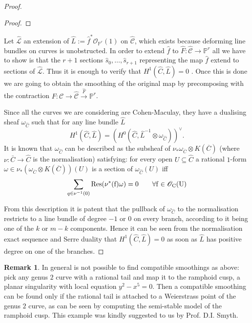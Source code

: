\documentclass[11pt]{amsart}
\newcommand{\PP}{\mathbb P}
\newcommand{\OO}{\mathcal O}
\renewcommand{\to}{\rightarrow}
\newcommand{\cC}{\mathcal C}
\theoremstyle{plain}
\theoremstyle{definition}
\newtheorem{remark}[thm]{Remark}
\begin{document}
\begin{proof}
\begin{proof}
\end{proof}

Let $\hat{\mathcal L}$ an extension of $\hat{L}:=\hat{f}^*\OO_{\PP^r}(1)$ on $\hat{\cC}$, which exists because deforming line bundles on curves is unobstructed.
In order to extend $\hat{f}$ to $\hat{F}\colon \hat{\cC}\to\PP^r$ all we have to show is that the $r+1$ sections $\hat{s}_0,\dots, \hat{s}_{r+1}$ representing the map $\hat{f}$ extend to sections of $\hat{\mathcal{L}}.$
Thus it is enough to verify that $H^1(\hat{C},\hat{L})=0$ \cite{Wang}. Once this is done we are going to obtain the smoothing of the original map by precomposing with the contraction $F\colon\cC\to\hat{\cC}\xrightarrow{\hat F}\PP^r$.

Since all the curves we are considering are Cohen-Maculay, they have a dualising sheaf $\omega_{\hat{C}}$ such that for any line bundle $\hat{L}$
\[H^1(\hat{C},\hat{L})=(H^0(\hat{C},\hat{L}^{-1}\otimes\omega_{\hat{C}}))^{\vee}.\]
It is known \cite[IV, \S~3]{serre} that  $\omega_{\hat{C}}$ can be described as the subsheaf of $\nu_* \omega_{\overline{C}}\otimes K(\overline{C})$ (where $\nu\colon\bar C\to\hat C$ is the normalisation) satisfying: for every open $U\subseteq\hat C$ a rational $1$-form $\omega\in \nu_*\left( \omega_{\overline{C}}\otimes K(\overline{C})\right)(U)$ is a section of $\omega_{\hat C}(U)$ iff
\[\sum_{q\in \nu^{-1}(0)}\rm{Res}(\nu^*(f)\omega) =0 \quad \quad \forall f\in\OO_C(U)\]

From this description it is patent that the pullback of $\omega_{\hat C}$ to the normalisation restricts to a line bundle of degree $-1$ or $0$ on every branch, according to it being one of the $k$ or $m-k$ components. Hence it can be seen from the normalisation exact sequence and Serre duality that $H^1(\hat{C},\hat{L})=0$ as soon as $\hat L$ has positive degree on one of the branches.
 \end{proof}
\begin{remark}\label{rem:compatible_smoothing}
In general is not possible to find compatible smoothings as above: pick any genus $2$ curve with a rational tail and map it to the ramphoid cusp, a planar singularity with local equation $y^2-x^5=0$. Then a compatible smoothing can be found only if the rational tail is attached to a Weierstrass point of the genus $2$ curve, as can be seen by computing the semi-stable model of the ramphoid cusp. This example was kindly suggested to us by Prof. D.I. Smyth.

\end{remark}
\end{document}
